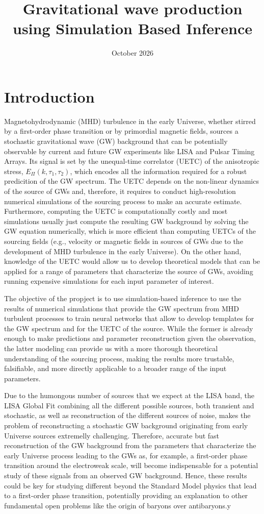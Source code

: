 \documentclass{article}
\title{Gravitational wave production using Simulation Based Inference}
\date{October 2026}
\begin{document}
\maketitle

\section{Introduction}
Magnetohydrodynamic (MHD) turbulence in the early Universe, whether stirred by a
first-order phase transition or by primordial magnetic fields, sources a
stochastic gravitational wave (GW) background that can be potentially
observable by current and future GW experiments like LISA and Pulsar
Timing Arrays.
Its signal is set by the unequal-time correlator (UETC) of the
anisotropic stress, $E_\Pi(k,\tau_1,\tau_2)$, which encodes all the information
required for a robust predicition of the GW spectrum.
The UETC depends on the non-linear dynamics of the source of GWs and, therefore,
it requires to conduct high-resolution numerical simulations of the sourcing process
to make an accurate estimate.
Furthermore, computing the UETC is computationally costly and most simulations
usually just compute the resulting GW background by solving the GW equation numerically,
which is more efficient than computing UETCs of the sourcing fields
(e.g., velocity or magnetic fields in sources of GWs due to the development
of MHD turbulence in the early Universe).
On the other hand, knowledge of the UETC would allow us to develop theoretical
models that can be applied for a range of parameters that characterize the source
of GWs, avoiding running expensive simulations for each input parameter
of interest.

The objective of the propject is to use simulation-based inference to use
the results of numerical simulations that provide the GW spectrum from MHD
turbulent processes to train neural networks that allow to develop templates
for the GW spectrum and for the UETC of the source.
While the former is already enough to make predictions and parameter reconstruction
given the observation, the latter modeling can provide us with a more thorough
theoretical understanding of the sourcing process, making the results more
trustable, falsifiable, and more directly applicable to a broader range
of the input parameters.

Due to the humongous number of sources that we expect at the LISA band, the
LISA Global Fit combining all the different possible sources, both transient and
stochastic, as well as reconstruction of the different sources of noise, makes the
problem of reconstructing a stochastic GW background originating from early Universe
sources extremelly challenging.
Therefore, accurate but fast reconstruction of the GW background from the parameters
that
characterize the early Universe process leading to the GWs as, for example,
a first-order phase transition around the electroweak scale, will become indispensable
for a potential study of these signals from an observed GW background.
Hence, these results could be key for studying different beyond the Standard Model
physics that lead to a first-order phase transition, potentially providing
an explanation to other fundamental open problems like the origin of baryons 
over antibaryons.y
\end{document}
